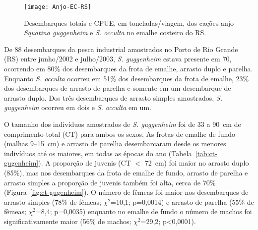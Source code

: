 \documentclass[a4paper,11pt,twoside,showtrims,onecolumn,openright,final]{memoir}
\begin{document}
%
%

\begin{figure}
\begin{center}
\texttt{[image: Anjo-EC-RS]}
\end{center}
\caption[Desembarques totais e CPUE dos cações-anjo no emalhe costeiro do RS.]
        {Desembarques totais e CPUE, em toneladas/viagem, 
	 dos cações-anjo \emph{Squatina guggenheim} e \emph{S. occulta} no emalhe costeiro do RS.}
\label{fig:emalhecosteiro-anjo}
\end{figure}



De 88 desembarques da pesca industrial amostrados no Porto de Rio Grande (RS) entre 
junho/2002 e julho/2003, \emph{S. guggenheim} estava presente em 70, ocorrendo 
em 80\% dos desembarques da frota de emalhe, arrasto duplo e parelha. 
Enquanto \emph{S. occulta} ocorreu em 51\% dos desembarques da frota de emalhe, 
23\% dos desembarques de arrasto de parelha e somente em um desembarque 
de arrasto duplo. Dos três desembarques de arrasto simples amostrados,  
\emph{S. guggenheim} ocorreu em dois e  \emph{S. occulta} em um.

O tamanho dos indivíduos amostrados de \emph{S. guggenheim} foi de 33 a 90~cm de comprimento total (CT) 
para ambos os sexos. As frotas de emalhe de fundo (malhas 9--15~cm) e arrasto de 
parelha desembarcaram desde os menores indivíduos até os maiores, 
em todas as épocas do ano (Tabela~\ref{tab:ct-gugenheim}).  
A proporção de juvenis (CT $<$ 72~cm) foi maior no arrasto duplo (85\%), 
mas nos desembarques da frota de emalhe de fundo, arrasto de parelha e arrasto simples 
a proporção de juvenis também foi alta, cerca de 70\% (Figura~\ref{fig:ct-gugenheim}). 
O número de fêmeas foi maior nos desembarques de arrasto simples 
(78\% de fêmeas; $\chi^2$=10,1; p=0,0014) e arrasto de parelha 
(55\% de fêmeas; $\chi^2$=8,4; p=0,0035) enquanto no emalhe de fundo o número 
de machos foi significativamente maior (56\% de machos; $\chi^2$=29,2; p<0,0001). 
\end{document}
